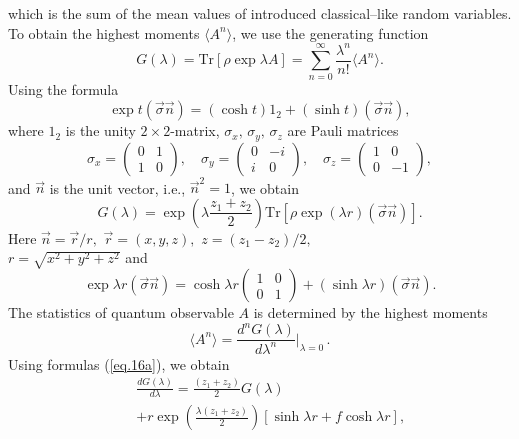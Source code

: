 \documentclass[12pt]{article}
\begin{document}
which is the sum of the mean values of introduced classical--like random variables. To obtain the highest moments $\langle A^n\rangle$, we use the generating function
\begin{equation}\label{eq.15}
G(\lambda)=\mbox{Tr}\left[\rho\exp\lambda A\right]=\sum_{n=0}^\infty\frac{\lambda^n}{n!}\langle A^n\rangle.
\end{equation}
Using the formula
\begin{equation}\label{eq.16}
\exp t(\vec\sigma\vec n)=(\cosh t)1_2+(\sinh t)(\vec\sigma \vec n), 
\end{equation}
where $1_2$ is the unity $2\times2$-matrix, $\sigma_x,\,\sigma_y,\,\sigma_z$ are Pauli matrices 
\begin{equation}\label{eq.17}
\sigma_x=\left(\begin{array}{cc}
0&1\\1&0\end{array}\right),\quad\sigma_y=\left(\begin{array}{cc}
0&-i\\i&0\end{array}\right),\quad\sigma_z=\left(\begin{array}{cc}
1&0\\0&-1\end{array}\right), 
\end{equation}
and $\vec n$ is the unit vector, i.e., $\vec n^2=1$, we obtain  
\begin{equation}\label{eq.18}
G(\lambda)=\exp\left(\lambda\frac{z_1+z_2}{2}\right)\mbox{Tr}\left[\rho\exp(\lambda r)(\vec\sigma\vec n)\right].
\end{equation}
Here $\vec n=\vec r/r,$ $ \vec r=(x,y,z),$ $z=(z_1-z_2)/2,$\\ $r=\sqrt{x^2+y^2+z^2}$ and 
\[\exp\lambda r(\vec \sigma\vec n )=\cosh\lambda r \left(\begin{array}{cc} 1&0\\0&1\end{array}\right)+(\sinh\lambda r)(\vec\sigma\vec n).\]
The statistics of quantum observable $A$ is determined by the highest moments
\begin{equation}\label{eq.16a}
\langle A^n\rangle=\frac{d^n G(\lambda)}{d\lambda^n}|_{\lambda=0}\,.
\end{equation}
Using formulas (\ref{eq.16a}), we obtain 
\begin{eqnarray}%
&&\frac{d G(\lambda)}{d\lambda}=\frac{(z_1+z_2)}{2}G(\lambda)\nonumber\\
&&+r\exp\left(
\frac{\lambda(z_1+z_2)}{2}\right)\left[\sinh\lambda r+f\cosh\lambda r\right],\label{eq.17a}
\end{eqnarray}
\end{document}
